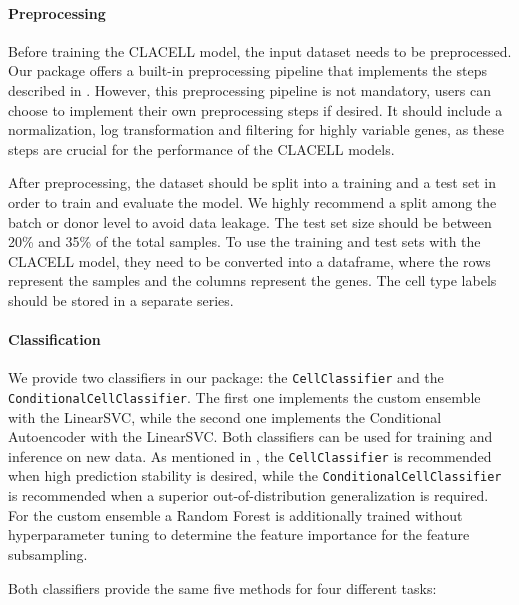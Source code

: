 \documentclass[11pt]{article}
\begin{document}
\paragraph{Preprocessing}

Before training the CLACELL model, the input dataset needs to be preprocessed. Our package offers a built-in preprocessing pipeline that implements the steps described in . 
However, this preprocessing pipeline is not mandatory, users can choose to implement their own preprocessing steps if desired. It should include a normalization, log transformation and filtering for highly variable genes, as these steps are crucial for the performance of the CLACELL models.

After preprocessing, the dataset should be split into a training and a test set in order to train and evaluate the model. We highly recommend a split among the batch or donor level to avoid data leakage. The test set size should be between 20\% and 35\% of the total samples.
To use the training and test sets with the CLACELL model, they need to be converted into a dataframe, where the rows represent the samples and the columns represent the genes.
The cell type labels should be stored in a separate series.


\paragraph{Classification}

We provide two classifiers in our package: the \texttt{CellClassifier} and the \texttt{ConditionalCellClassifier}. The first one implements the custom ensemble with the LinearSVC, while the second one implements the Conditional Autoencoder with the LinearSVC. Both classifiers can be used for training and inference on new data. As mentioned in , the \texttt{CellClassifier} is recommended when high prediction stability is desired, while the \texttt{ConditionalCellClassifier} is recommended when a superior out-of-distribution generalization is required. For the custom ensemble a Random Forest is additionally trained without hyperparameter tuning to determine the feature importance for the feature subsampling.

Both classifiers provide the same five methods for four different tasks:
\end{document}
